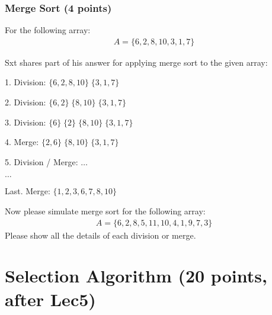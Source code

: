 \documentclass[11pt]{exam}
\begin{document}
\subsubsection{Merge Sort (4 points)}
For the following array:
\begin{align*}
A = \{6, 2, 8, 10, 3, 1, 7\}
\end{align*}

Sxt shares part of his answer for applying merge sort to the given array: 
\begin{solution}

1. Division: $\{6,2,8,10\}\;\{3,1,7\}$

2. Division: $\{6,2\}\;\{8,10\}\;\{3,1,7\}$

3. Division: $\{6\}\;\{2\}\;\{8,10\}\;\{3,1,7\}$

4. Merge: $\{2,6\}\;\{8,10\}\;\{3,1,7\}$

5. Division / Merge: $\dots$

$\dots$

Last. Merge: $\{1,2,3,6,7,8,10\}$
\end{solution}

Now please simulate merge sort for the following array:
\begin{align*}
A = \{6, 2, 8, 5, 11, 10, 4, 1, 9, 7, 3\}
\end{align*}
Please show all the details of each division or merge. 
\begin{solution}
\end{solution}
\newpage
\section{Selection Algorithm (20 points, after Lec5)}
\end{document}
